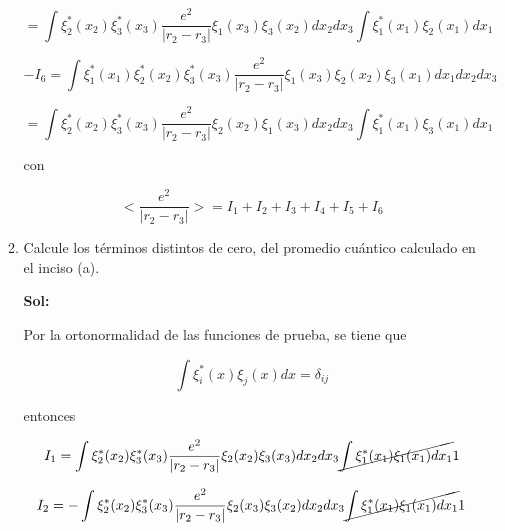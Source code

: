 \documentclass[12pt,a4paper]{article}
\begin{document}
\begin{enumerate}
\begin{enumerate}
    \begin{equation*}
        =\int \xi_{2}^{*}(x_2) \xi_{3}^{*}(x_3)\frac{e^2}{|r_2 -r_3|} \xi_1(x_3) \xi_3 (x_2)  dx_2 dx_3 \int \xi_{1}^{*}(x_1)\xi_2 (x_1) dx_1
    \end{equation*}
    
    \begin{equation*}
        -I_6 =\int \xi_{1}^{*}(x_1) \xi_{2}^{*}(x_2) \xi_{3}^{*}(x_3)\frac{e^2}{|r_2 -r_3|}\xi_1 (x_3) \xi_2(x_2) \xi_3 (x_1) dx_1 dx_2 dx_3
    \end{equation*}
    
    \begin{equation*}
        =\int \xi_{2}^{*}(x_2) \xi_{3}^{*}(x_3)\frac{e^2}{|r_2 -r_3|} \xi_2(x_2) \xi_1 (x_3)  dx_2 dx_3 \int \xi_{1}^{*}(x_1)\xi_3 (x_1) dx_1
    \end{equation*}
    
    con
    
    \begin{equation*}
        <\frac{e^2}{|r_2 - r_3|}> = I_1 + I_2 + I_3 +I_4 +I_5 +I_6
    \end{equation*}
    
    
    
    
    
    \item Calcule los términos distintos de cero, del promedio cuántico calculado en el inciso (a).
    
    \textbf{Sol:}
    
    Por la ortonormalidad de las funciones de prueba, se tiene que
    
    \begin{equation*}
        \int \xi_{i}^{*} (x) \xi_j(x) dx  = \delta_{ij}
    \end{equation*}
    
    entonces
    
    
    
    \begin{equation*}
        I_1=\int \xi_{2}^{*}(x_2) \xi_{3}^{*}(x_3)\frac{e^2}{|r_2 -r_3|} \xi_2(x_2) \xi_3 (x_3)  dx_2 dx_3 \cancel{\int \xi_{1}^{*}(x_1)\xi_1 (x_1) dx_1}1
    \end{equation*}
    
    
    
    
    \begin{equation*}
        I_2=-\int \xi_{2}^{*}(x_2) \xi_{3}^{*}(x_3)\frac{e^2}{|r_2 -r_3|} \xi_2(x_3) \xi_3 (x_2)  dx_2 dx_3 \cancel{\int \xi_{1}^{*}(x_1)\xi_1 (x_1) dx_1}1
    \end{equation*}
    

\end{enumerate}
\end{enumerate}
\end{document}
